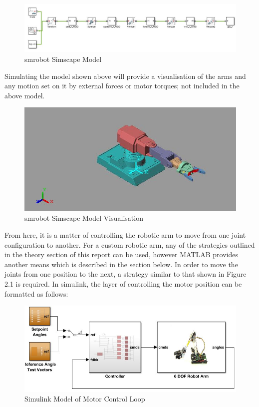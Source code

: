 \documentclass[12pt,openany,a4paper]{book}
\begin{document}
\begin{center}
\begin{figure}[htb]
  \includegraphics[width=\linewidth]{simscape_robotic_arm.jpg}
\caption{smrobot Simscape Model}
\end{figure}
\end{center}

Simulating the model shown above will provide a visualisation of the arms and any motion set on it by external forces or motor torques; not included in the above model.

\begin{center}
\begin{figure}[htb]
  \includegraphics[width=\linewidth]{simscape_robotic_arm_model.jpg}
\caption{smrobot Simscape Model Visualisation}
\end{figure}
\end{center}

From here, it is a matter of controlling the robotic arm to move from one joint configuration to another. For a custom robotic arm, any of the strategies outlined in the theory section of this report can be used, however MATLAB provides another means which is described in the section below. In order to move the joints from one position to the next, a strategy similar to that shown in Figure 2.1 is required. In simulink, the layer of controlling the motor position can be formatted as follows:

\begin{center}
\begin{figure}[htb]
  \includegraphics[width=\linewidth]{simulink_motor_control_loop.jpg}
\caption{Simulink Model of Motor Control Loop}
\end{figure}
\end{center}
\end{document}
